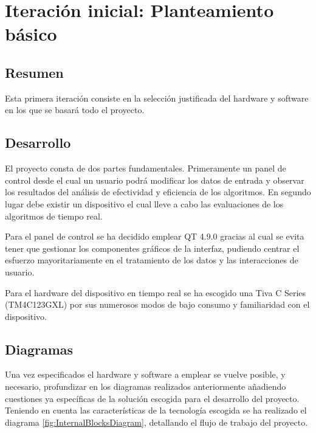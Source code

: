 
\section{Iteración inicial: Planteamiento básico}
        \subsection{Resumen}
        
        Esta primera iteración consiste en la selección justificada del hardware y software en los que se basará todo el proyecto.
        
        \subsection{Desarrollo}

        El proyecto consta de dos partes fundamentales. Primeramente un panel de control desde el cual un usuario podrá modificar los datos de entrada y observar los resultados del análisis de efectividad y eficiencia de los algoritmos. En segundo lugar debe existir un dispositivo el cual lleve a cabo las evaluaciones de los algoritmos de tiempo real.

        Para el panel de control se ha decidido emplear QT 4.9.0 gracias al cual se evita tener que gestionar los componentes gráficos de la interfaz, pudiendo centrar el esfuerzo mayoritariamente en el tratamiento de los datos y las interacciones de usuario.
        
        Para el hardware del dispositivo en tiempo real se ha escogido una Tiva C Series (TM4C123GXL) por sus numerosos modos de bajo consumo y familiaridad con el dispositivo.        

        \subsection{Diagramas}

        Una vez especificados el hardware y software a emplear se vuelve posible, y necesario, profundizar en los diagramas realizados anteriormente añadiendo cuestiones ya específicas de la solución escogida para el desarrollo del proyecto. Teniendo en cuenta las características de la tecnología escogida se ha realizado el diagrama \ref{fig:InternalBlocksDiagram}, detallando el flujo de trabajo del proyecto.

